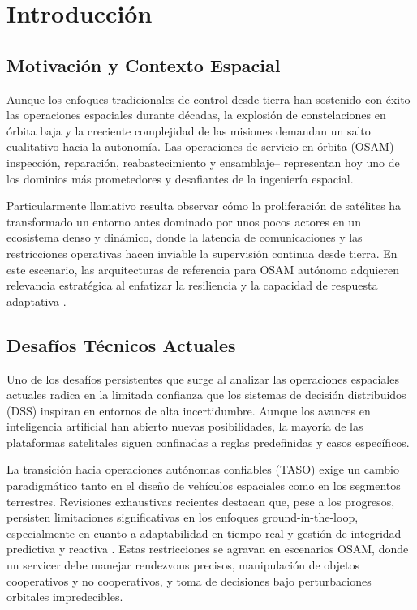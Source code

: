 \section{Introducción}

\subsection{Motivación y Contexto Espacial}

Aunque los enfoques tradicionales de control desde tierra han sostenido con éxito las operaciones espaciales durante décadas, la explosión de constelaciones en órbita baja y la creciente complejidad de las misiones demandan un salto cualitativo hacia la autonomía. Las operaciones de servicio en órbita (OSAM) --inspección, reparación, reabastecimiento y ensamblaje-- representan hoy uno de los dominios más prometedores y desafiantes de la ingeniería espacial. 

Particularmente llamativo resulta observar cómo la proliferación de satélites ha transformado un entorno antes dominado por unos pocos actores en un ecosistema denso y dinámico, donde la latencia de comunicaciones y las restricciones operativas hacen inviable la supervisión continua desde tierra. En este escenario, las arquitecturas de referencia para OSAM autónomo adquieren relevancia estratégica al enfatizar la resiliencia y la capacidad de respuesta adaptativa \cite{RefArch_OSAM2022}.

\subsection{Desafíos Técnicos Actuales}

Uno de los desafíos persistentes que surge al analizar las operaciones espaciales actuales radica en la limitada confianza que los sistemas de decisión distribuidos (DSS) inspiran en entornos de alta incertidumbre. Aunque los avances en inteligencia artificial han abierto nuevas posibilidades, la mayoría de las plataformas satelitales siguen confinadas a reglas predefinidas y casos específicos. 

La transición hacia operaciones autónomas confiables (TASO) exige un cambio paradigmático tanto en el diseño de vehículos espaciales como en los segmentos terrestres. Revisiones exhaustivas recientes destacan que, pese a los progresos, persisten limitaciones significativas en los enfoques ground-in-the-loop, especialmente en cuanto a adaptabilidad en tiempo real y gestión de integridad predictiva y reactiva \cite{Thangavel2024}. Estas restricciones se agravan en escenarios OSAM, donde un servicer debe manejar rendezvous precisos, manipulación de objetos cooperativos y no cooperativos, y toma de decisiones bajo perturbaciones orbitales impredecibles.

